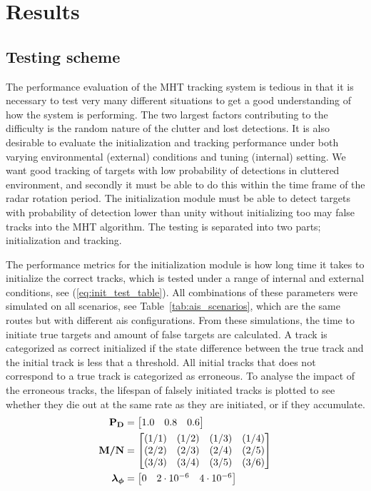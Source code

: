 
\chapter{Results}\label{chapter:results}
\section{Testing scheme}
The performance evaluation of the MHT tracking system is tedious in that it is necessary to test very many different situations to get a good understanding of how the system is performing. The two largest factors contributing to the difficulty is the random nature of the clutter and lost detections. It is also desirable to evaluate the initialization and tracking performance under both varying environmental (external) conditions and tuning (internal) setting. We want good tracking of targets with low probability of detections in cluttered environment, and secondly it must be able to do this within the time frame of the radar rotation period. The initialization module must be able to detect targets with probability of detection lower than unity without initializing too may false tracks into the MHT algorithm. The testing is separated into two parts; initialization and tracking.

The performance metrics for the initialization module is how long time it takes to initialize the correct tracks, which is tested under a range of internal and external conditions, see (\ref{eq:init_test_table}). All combinations of these parameters were simulated on all scenarios, see Table~\ref{tab:ais_scenarios}, which are the same routes but with different \gls{ais} configurations. From these simulations, the time to initiate true targets and amount of false targets are calculated. A track is categorized as correct initialized if the state difference between the true track and the initial track is less that a threshold. All initial tracks that does not correspond to a true track is categorized as erroneous. To analyse the impact of the erroneous tracks, the lifespan of falsely initiated tracks is plotted to see whether they die out at the same rate as they are initiated, or if they accumulate.  
\begin{equation}\label{eq:init_test_table}
\begin{split}
\boldsymbol{\mathbf{P_D}} &= \begin{bmatrix} 1.0 & 0.8 & 0.6 \end{bmatrix} \\
\boldsymbol{\mathbf{M/N}} &= \begin{bmatrix} 	(1/1) & (1/2) & (1/3) & (1/4) \\
							(2/2) & (2/3) & (2/4) & (2/5) \\
							(3/3) & (3/4) & (3/5) & (3/6)
		   \end{bmatrix} \\
\boldsymbol{\mathbf{\lambda_\phi}} &= \begin{bmatrix} 0 & 2\cdot10^{-6} & 4\cdot10^{-6} \end{bmatrix}
\end{split}
\end{equation}

